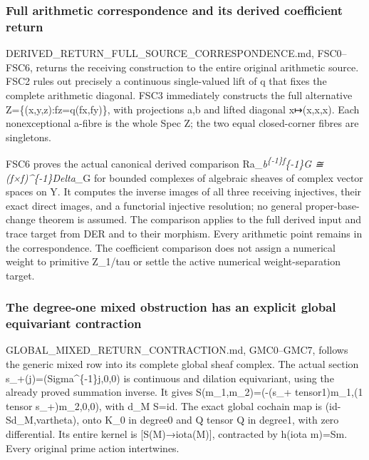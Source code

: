 \subsubsection{Full arithmetic correspondence and its derived
coefficient
return}\label{full-arithmetic-correspondence-and-its-derived-coefficient-return}

DERIVED\_RETURN\_FULL\_SOURCE\_CORRESPONDENCE.md, FSC0--FSC6, returns
the receiving construction to the entire original arithmetic source.
FSC2 rules out precisely a continuous single-valued lift of q that fixes
the complete arithmetic diagonal. FSC3 immediately constructs the full
alternative Z=\{(x,y,z):fz=q(fx,fy)\}, with projections a,b and lifted
diagonal x↦(x,x,x). Each nonexceptional a-fibre is the whole Spec Z; the
two equal closed-corner fibres are singletons.

FSC6 proves the actual canonical derived comparison
Ra\_\emph{b\textsuperscript{\{-1\}f}\{-1\}G ≅ (f×f)\^{}\{-1\}Delta\_}G
for bounded complexes of algebraic sheaves of complex vector spaces on
Y. It computes the inverse images of all three receiving injectives,
their exact direct images, and a functorial injective resolution; no
general proper-base-change theorem is assumed. The comparison applies to
the full derived input and trace target from DER and to their morphism.
Every arithmetic point remains in the correspondence. The coefficient
comparison does not assign a numerical weight to primitive Z\_1/tau or
settle the active numerical weight-separation target.

\subsubsection{The degree-one mixed obstruction has an explicit global
equivariant
contraction}\label{the-degree-one-mixed-obstruction-has-an-explicit-global-equivariant-contraction}

GLOBAL\_MIXED\_RETURN\_CONTRACTION.md, GMC0--GMC7, follows the generic
mixed row into its complete global sheaf complex. The actual section
s\_+(j)=(Sigma\^{}\{-1\}j,0,0) is continuous and dilation equivariant,
using the already proved summation inverse. It gives
S(m\_1,m\_2)=(-(s\_+ tensor1)m\_1,(1 tensor s\_+)m\_2,0,0), with d\_M
S=id. The exact global cochain map is (id-Sd\_M,vartheta), onto K\_0 in
degree0 and Q tensor Q in degree1, with zero differential. Its entire
kernel is {[}S(M)→iota(M){]}, contracted by h(iota m)=Sm. Every original
prime action intertwines.

